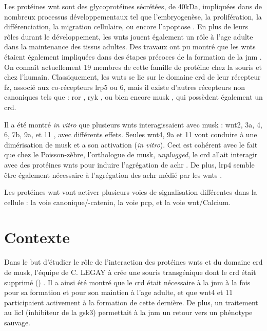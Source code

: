 	Les protéines \gls{wnt} sont des glycoprotéines sécrétées, de 40kDa, impliquées dans de nombreux processus développementaux tel que l'embryogenèse, la prolifération, la différenciation, la migration cellulaire, ou encore l'apoptose \cite{Miller2002, Willert2012a}. En plus de leurs rôles durant le développement, les \Glspl{wnt} jouent également un rôle à l'age adulte dans la maintenance des tissus adultes. Des travaux ont pu montré que les \Glspl{wnt} étaient également impliquées dans des étapes précoces de la formation de la \gls{jnm} \cite{Hall2000}. On connaît actuellement 19 membres de cette famille de protéine chez la souris et chez l'humain. Classiquement, les \Glspl{wnt} se lie sur le domaine \gls{crd} de leur récepteur \gls{fz}, associé aux co-récepteurs \gls{lrp}5 ou 6, mais il existe d'autres récepteurs non canoniques tels que : \acrshort{ror} \cite{Cadigan2006, Gordon2006, Green2008}, \acrshort{ryk} \cite{Bovolenta2006, Fradkin2010}, ou bien encore \gls{musk} \cite{Jing2009}, qui possèdent également un \gls{crd}.
	
	Il a été montré \emph{in vitro} que plusieurs \Glspl{wnt} interagissaient avec \gls{musk} : \Gls{wnt}2, 3a, 4, 6, 7b, 9a, et 11 \cite{Strochlic2012, Zhang2012, Barik2014}, avec différents effets. Seules \gls{wnt}4, 9a et 11 vont conduire à une dimérisation de \gls{musk} et a son activation (\emph{in vitro}). Ceci est cohérent avec le fait que chez le Poisson-zèbre, l'orthologue de \gls{musk}, \emph{unplugged}, le \gls{crd} allait interagir avec des protéines \Glspl{wnt} pour induire l'agrégation de \gls{achr} \cite{Jing2009, Gordon2012}. De plus, \gls{lrp}4 semble être également nécessaire à l'agrégation des \gls{achr} médié par les \gls{wnt}s \cite{Zhang2012}.
	
	Les protéines \gls{wnt} vont activer plusieurs voies de signalisation différentes dans la cellule :  la voie canonique/\textbeta{}-catenin, la voie \gls{pcp}, et la voie \gls{wnt}/Calcium. 

\section{Contexte}
	\label{sec:Contexte}
	
	Dans le but d'étudier le rôle de l'interaction des protéines \Glspl{wnt} et du domaine \gls{crd} de \gls{musk}, l'équipe de C. LEGAY à crée une souris transgénique dont le \gls{crd} était supprimé (\mcrd) \cite{Messeant2015, Messeant2017}. Il a ainsi été montré que le \gls{crd} était nécessaire à la \gls{jnm} à la fois pour sa formation et pour son maintien à l'age adulte, et que \Gls{wnt}4 et 11 participaient activement à la formation de cette dernière. De plus, un traitement au \gls{licl} (inhibiteur de la \gls{gsk3}) permettait à la \gls{jnm} un retour vers un phénotype sauvage.
	
